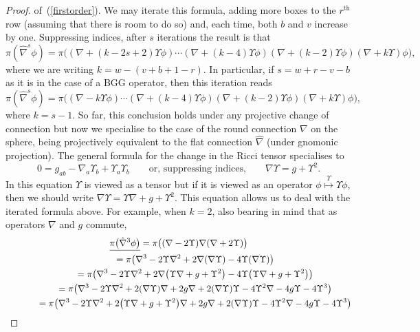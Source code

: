 \documentclass[pdftex]{sigma}
\begin{document}
\begin{proof}
of~(\ref{firstorder}). We may iterate this formula, adding more boxes to the
$r^{\mathrm{th}}$ row (assuming that there is room to do so) and, each time,
both $b$ and $v$ increase by one. Suppressing indices, after $s$
iterations the result is that
\[\pi(\hat\nabla^s\phi)=\pi\big(
(\nabla+(k-2s+2)\Upsilon\phi)\cdots
(\nabla+(k-4)\Upsilon\phi)(\nabla+(k-2)\Upsilon\phi)
(\nabla+k\Upsilon)\phi\big),\]
where we are writing $k=w-(v+b+1-r)$. In particular, if $s=w+r-v-b$ as it
is in the case of a BGG operator, then this iteration reads
\[\pi(\hat\nabla^s\phi)=\pi\big(
(\nabla-k\Upsilon\phi)\cdots
(\nabla+(k-4)\Upsilon\phi)(\nabla+(k-2)\Upsilon\phi)
(\nabla+k\Upsilon)\phi\big),\]
where $k=s-1$.
So far, this conclusion holds under any projective change of connection but now
we specialise to the case of the round connection $\nabla$ on the sphere, being
projectively equivalent to the f\/lat connection $\hat\nabla$ (under gnomonic
projection). The general formula \cite[(3.4)]{eProjective} for the
change in the Ricci tensor specialises to
\[0=g_{ab}-\nabla_a\Upsilon_b+\Upsilon_a\Upsilon_b\qquad\mbox{or, suppressing
indices,}\qquad\nabla\Upsilon=g+\Upsilon^2.\]
In this equation $\Upsilon$ is viewed as a tensor but if it is viewed as an
operator $\phi\stackrel{\Upsilon}{\longmapsto}\Upsilon\phi$, then we should
write $\nabla\Upsilon=\Upsilon\nabla+g+\Upsilon^2$. This equation allows us to
deal with the iterated formula above. For example, when $k=2$, also bearing in
mind that as operators $\nabla$ and $g$ commute,
 \begin{gather*}
 \underline{\pi\big(\hat\nabla^3\phi\big)}=
 \pi\big((\nabla-2\Upsilon)\nabla(\nabla+2\Upsilon)\big)\\
\hphantom{\underline{\pi\big(\hat\nabla^3\phi\big)}}{} = \pi\big(\nabla^3-2\Upsilon\nabla^2+2\nabla(\nabla\Upsilon)
-4\Upsilon(\nabla\Upsilon)\big)\\
\hphantom{\underline{\pi\big(\hat\nabla^3\phi\big)}}{} =
\pi\big(\nabla^3-2\Upsilon\nabla^2+2\nabla\big(\Upsilon\nabla+g+\Upsilon^2\big)
-4\Upsilon\big(\Upsilon\nabla+g+\Upsilon^2\big)\big)\\
\hphantom{\underline{\pi\big(\hat\nabla^3\phi\big)}}{} = \pi\big(\nabla^3-2\Upsilon\nabla^2+2(\nabla\Upsilon)\nabla+2g\nabla
+2(\nabla\Upsilon)\Upsilon
-4\Upsilon^2\nabla-4g\Upsilon-4\Upsilon^3\big)\\
\hphantom{\underline{\pi\big(\hat\nabla^3\phi\big)}}{} = \pi\big(\nabla^3-2\Upsilon\nabla^2+2\big(\Upsilon\nabla+g+\Upsilon^2\big)\nabla+2g\nabla
+2(\nabla\Upsilon)\Upsilon
-4\Upsilon^2\nabla-4g\Upsilon-4\Upsilon^3\big)\\

\end{gather*}
\end{proof}
\end{document}
